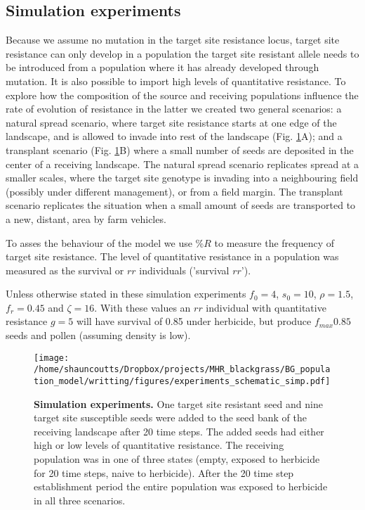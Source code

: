 \documentclass[10pt,letterpaper]{article}
\begin{document}
\subsection*{Simulation experiments}
Because we assume no mutation in the target site resistance locus, target site resistance can only develop in a population the target site resistant allele needs to be introduced from a population where it has already developed through mutation. It is also possible to import high levels of quantitative resistance. To explore how the composition of the source and receiving populations influence the rate of evolution of resistance in the latter we created two general scenarios: a natural spread scenario, where target site resistance starts at one edge of the landscape, and is allowed to invade into rest of the landscape (Fig. \ref{fig:exper}A); and a transplant scenario (Fig. \ref{fig:exper}B) where a small number of seeds are deposited in the center of a receiving landscape. The natural spread scenario replicates spread at a smaller scales, where the target site genotype is invading into a neighbouring field (possibly under different management), or from a field margin. The transplant scenario replicates the situation when a small amount of seeds are transported to a new, distant, area by farm vehicles. 

To asses the behaviour of the model we use \%$R$ to measure the frequency of target site resistance. The level of quantitative resistance in a population was measured as the survival or $rr$ individuals ('survival $rr$').

Unless otherwise stated in these simulation experiments $f_0 = 4$, $s_0 = 10$, $\rho = 1.5$, $f_r = 0.45$ and $\zeta = 16$. With these values an $rr$ individual with quantitative resistance $g = 5$ will have survival of 0.85 under herbicide, but produce $f_{max} 0.85$ seeds and pollen (assuming density is low).

\begin{figure}[!h] 
	\texttt{[image: /home/shauncoutts/Dropbox/projects/MHR\_blackgrass/BG\_population\_model/writting/figures/experiments\_schematic\_simp.pdf]}
\caption{{\bf Simulation experiments.} One target site resistant seed and nine target site susceptible seeds were added to the seed bank of the receiving landscape after 20 time steps. The added seeds had either high or low levels of quantitative resistance. The receiving population was in one of three states (empty, exposed to herbicide for 20 time steps, naive to herbicide). After the 20 time step establishment period the entire population was exposed to herbicide in all three scenarios.} 
\label{fig:exper}
\end{figure}
\end{document}
